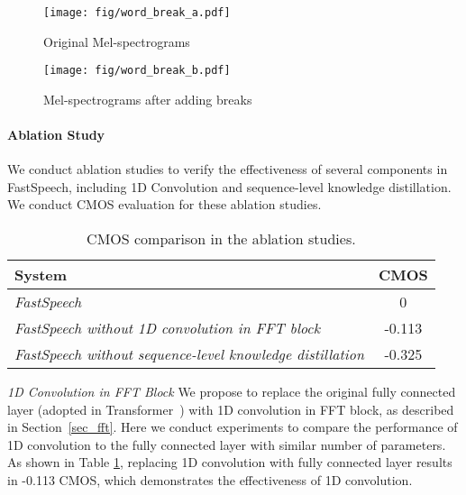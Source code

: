 \documentclass{article}
\begin{document}
\begin{figure*}[h] 
	\centering
	\begin{subfigure}[h]{0.48\textwidth}
		\centering
		\texttt{[image: fig/word\_break\_a.pdf]}
		\caption{Original Mel-spectrograms}
		\label{fig_break_ori}
	\end{subfigure}
	\begin{subfigure}[h]{0.48\textwidth}
		\centering
		\texttt{[image: fig/word\_break\_b.pdf]}
		\caption{Mel-spectrograms after adding breaks}
		\label{fig_add_break}
	\end{subfigure}
	\caption{The mel-spectrograms before and after adding breaks between words. The corresponding text is "\textit{that he appeared to feel \textbf{deeply} the force of the reverend gentleman's observations, \textbf{especially} when the chaplain spoke of}". We add breaks after the words "\textit{deeply}" and "\textit{especially}" to improve the prosody. The red boxes in Figure \ref{fig_add_break} correspond to the added breaks.}
	\label{fig_breaking}
\end{figure*}



\paragraph{Ablation Study}
We conduct ablation studies to verify the effectiveness of several components in FastSpeech, including 1D Convolution and sequence-level knowledge distillation. We conduct CMOS evaluation for these ablation studies.


\begin{table}[h]
	\centering
	\begin{tabular}{ l | c }
		\toprule
		System &  CMOS \\
		\midrule
		\textit{FastSpeech} & 0 \\
		\midrule
		\textit{FastSpeech without 1D convolution in FFT block} & -0.113 \\
		\midrule
		\textit{FastSpeech without sequence-level knowledge distillation} & -0.325 \\
\bottomrule
	\end{tabular}
	\vspace{0.3cm}
	\caption{CMOS comparison in the ablation studies.}\label{tab_abl}
	\vspace{-0.2cm}
\end{table}

\emph{1D Convolution in FFT Block}
We propose to replace the original fully connected layer (adopted in Transformer~\citep{vaswani2017attention}) with 1D convolution in FFT block, as described in Section~\ref{sec_fft}. Here we conduct experiments to compare the performance of 1D convolution to the fully connected layer with similar number of parameters. As shown in Table \ref{tab_abl}, replacing 1D convolution with fully connected layer results in -0.113 CMOS, which demonstrates the effectiveness of 1D convolution.
\end{document}
